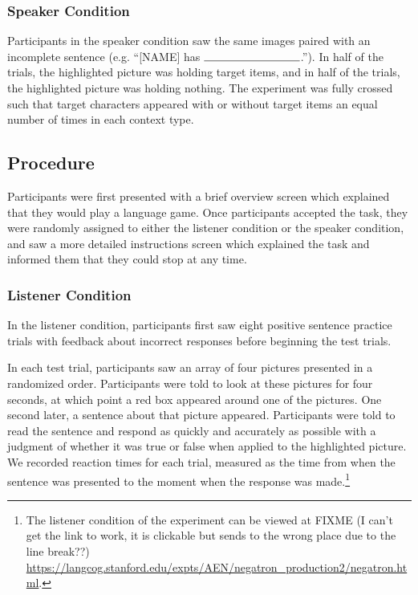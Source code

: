 \documentclass[man, noapacite]{apa2}
\begin{document}
\subsubsection{Speaker Condition}
Participants in the speaker condition saw the same images paired with an incomplete sentence (e.g. ``[NAME] has $\rule{3cm}{0.15mm}$.''). In half of the trials, the highlighted picture was holding target items, and in half of the trials, the highlighted picture was holding nothing.  The experiment was fully crossed such that target characters appeared with or without target items an equal number of times in each context type.  

\subsection{Procedure}
Participants were first presented with a brief overview screen which explained that they would play a language game.  Once participants accepted the task, they were randomly assigned to either the listener condition or the speaker condition, and saw a more detailed instructions screen which explained the task and informed them that they could stop at any time.  

\subsubsection{Listener Condition}

In the listener condition, participants first saw eight positive sentence practice trials with feedback about incorrect responses before beginning the test trials. 

In each test trial, participants saw an array of four pictures presented in a randomized order.  Participants were told to look at these pictures for four seconds, at which point a red box appeared around one of the pictures.  One second later, a sentence about that picture appeared.  Participants were told to read the sentence and respond as quickly and accurately as possible with a judgment of whether it was true or false when applied to the highlighted picture.  We recorded reaction times for each trial, measured as the time from when the sentence was presented to the moment when the response was made.\footnote{The listener condition of the experiment can be viewed at 
FIXME (I can't get the link to work, it is clickable but sends to the wrong place due to the line break??) \url{https://langcog.stanford.edu/expts/AEN/negatron_production2/negatron.html}.}
\end{document}
